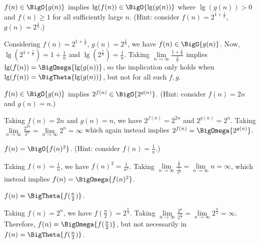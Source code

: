 \documentclass[12pt,letterpaper]{hmcpset}
\begin{document}
\begin{problem}[7b]
$f(n) \in \BigO{g(n)}$ implies $\lg(f(n)) \in \BigO{\lg(g(n))}$ where $\lg(g(n)) > 0$ and $f(n) \geq 1$ for all sufficiently large $n$.  (Hint: consider $f(n) = 2^{1+\frac{1}{n}}$, $g(n) = 2^\frac{1}{n}$.)
\end{problem}

\begin{solution}
Considering $f(n) = 2^{1+\frac{1}{n}}$, $g(n) = 2^\frac{1}{n}$, we have $f(n) \in \BigO{g(n)}$.  Now, $\lg(2^{1+\frac{1}{n}}) = 1+\frac{1}{n}$ and $\lg( 2^\frac{1}{n}) =\frac{1}{n}$. Taking $\lim\limits_{n \to \infty} \frac{1 + \frac{1}{n}}{\frac{1}{n}}$ implies $\lg(f(n)) = \BigOmega{\lg(g(n))}$, so the implication only holds when $\lg(f(n)) = \BigTheta{\lg(g(n))}$, but not for all such $f,g$.
\end{solution}

\begin{problem}[7c]
$f(n) \in \BigO{g(n)}$ implies $2^{f(n)} \in \BigO{2^{g(n)}}$.  (Hint: consider $f(n) = 2n$ and $g(n) = n$.)
\end{problem}

\begin{solution}
Taking $f(n) = 2n$ and $g(n) = n$, we have $2^{f(n)} = 2^{2n}$ and $2^{g(n)} = 2^n$.  Taking $\lim\limits_{n \to \infty} \frac{2^{2n}}{2^n} = \lim\limits_{n \to \infty} 2^n = \infty$ which again instead implies $2^{f(n)} = \BigOmega{2^{g(n)}}$.
\end{solution}

\begin{problem}[7d]
$f(n) = \BigO{f(n)^2}$. (Hint: consider $f(n) = \frac{1}{n}$.)
\end{problem}

\begin{solution}
Taking $f(n) = \frac{1}{n}$, we have $f(n)^2 = \frac{1}{n^2}$.  Taking $\lim\limits_{n \to \infty} \frac{\frac{1}{n}}{\frac{1}{n^2}} = \lim\limits_{n \to \infty} n = \infty$, which instead implies $f(n) = \BigOmega{f(n)^2}$.
\end{solution}

\begin{problem}[7e]
$f(n) = \BigTheta{f(\frac{n}{2})}$.
\end{problem}

\begin{solution}
Taking $f(n) = 2^n$, we have $f(\frac{n}{2}) = 2^\frac{n}{2}$.  Taking  $\lim\limits_{n \to \infty} \frac{2^n}{2^\frac{n}{2}} = \lim\limits_{n \to \infty} 2^\frac{n}{2} = \infty$.  Therefore, $f(n) = \BigOmega{f(\frac{n}{2})}$, but not necessarily in $f(n) = \BigTheta{f(\frac{n}{2})}$.
\end{solution}
\end{document}
